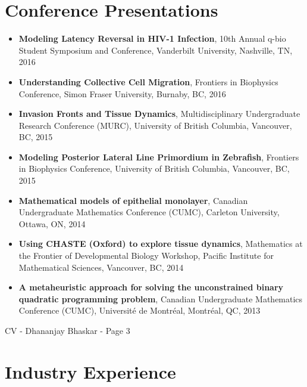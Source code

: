 \documentclass[margin,line]{res}
\begin{document}
\begin{resume}
\vspace*{.4cm}

\section{\sc Conference Presentations}

{\renewcommand\leftmargini{0em}
\begin{itemize}
\item {\bf Modeling Latency Reversal in HIV-1 Infection}, 10th Annual q-bio Student Symposium and Conference, Vanderbilt University, Nashville, TN, 2016
\vspace*{.1cm}
\item {\bf Understanding Collective Cell Migration}, Frontiers in Biophysics Conference, Simon Fraser University, Burnaby, BC, 2016
\vspace*{.1cm}
\item {\bf Invasion Fronts and Tissue Dynamics}, Multidisciplinary Undergraduate Research Conference (MURC), University of British Columbia, Vancouver, BC, 2015
\vspace*{.1cm}
\item {\bf Modeling Posterior Lateral Line Primordium in Zebrafish}, Frontiers in Biophysics Conference, University of British Columbia, Vancouver, BC, 2015
\vspace*{.1cm}
\item {\bf Mathematical models of epithelial monolayer}, Canadian Undergraduate Mathematics Conference (CUMC), Carleton University, Ottawa, ON, 2014
\vspace*{.1cm}
\item {\bf Using CHASTE (Oxford) to explore tissue dynamics}, Mathematics at the Frontier of Developmental Biology Workshop, Pacific Institute for Mathematical Sciences, Vancouver, BC, 2014
\item {\bf A metaheuristic approach for solving the unconstrained binary quadratic programming problem}, Canadian Undergraduate Mathematics Conference (CUMC), Universit\'e de Montr\'eal, Montr\'eal, QC, 2013
\end{itemize}
}

\newpage
\begin{flushright}
CV - Dhananjay Bhaskar - Page 3
\end{flushright}
\vspace*{.2cm}

\section{\sc Industry Experience}


\end{resume}
\end{document}
